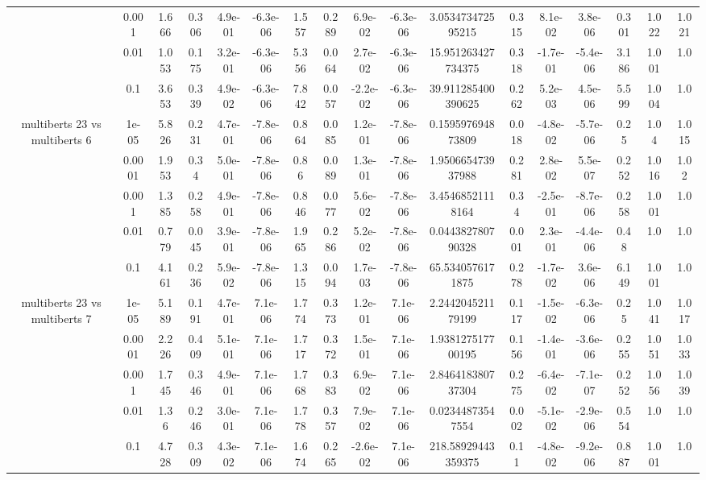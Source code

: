 \begin{tabular}{|c|c|c|c|c|c|c|c|c|c|c|c|c|c|c|c|c|}
 & 0.001 & 1.666 & 0.306 & 4.9e-01 & -6.3e-06 & 1.557 & 0.289 & 6.9e-02 & -6.3e-06 & 3.053473472595215 & 0.315 & 8.1e-02 & 3.8e-06 & 0.301 & 1.022 & 1.021 \\
 & 0.01 & 1.053 & 0.175 & 3.2e-01 & -6.3e-06 & 5.356 & 0.064 & 2.7e-02 & -6.3e-06 & 15.951263427734375 & 0.318 & -1.7e-01 & -5.4e-06 & 3.186 & 1.001 & 1.0 \\
 & 0.1 & 3.653 & 0.339 & 4.9e-02 & -6.3e-06 & 7.842 & 0.057 & -2.2e-02 & -6.3e-06 & 39.911285400390625 & 0.262 & 5.2e-03 & 4.5e-06 & 5.599 & 1.004 & 1.0 \\
\hline
\multirow{5}{*}{multiberts 23 vs multiberts 6} & 1e-05 & 5.826 & 0.231 & 4.7e-01 & -7.8e-06 & 0.864 & 0.085 & 1.2e-01 & -7.8e-06 & 0.159597694873809 & 0.018 & -4.8e-02 & -5.7e-06 & 0.25 & 1.04 & 1.015 \\
 & 0.0001 & 1.953 & 0.34 & 5.0e-01 & -7.8e-06 & 0.86 & 0.089 & 1.3e-01 & -7.8e-06 & 1.950665473937988 & 0.281 & 2.8e-02 & 5.5e-07 & 0.252 & 1.016 & 1.02 \\
 & 0.001 & 1.385 & 0.258 & 4.9e-01 & -7.8e-06 & 0.846 & 0.077 & 5.6e-02 & -7.8e-06 & 3.45468521118164 & 0.34 & -2.5e-01 & -8.7e-06 & 0.258 & 1.001 & 1.0 \\
 & 0.01 & 0.779 & 0.045 & 3.9e-01 & -7.8e-06 & 1.965 & 0.286 & 5.2e-02 & -7.8e-06 & 0.044382780790328 & 0.001 & 2.3e-01 & -4.4e-06 & 0.48 & 1.0 & 1.0 \\
 & 0.1 & 4.161 & 0.236 & 5.9e-02 & -7.8e-06 & 1.315 & 0.094 & 1.7e-03 & -7.8e-06 & 65.5340576171875 & 0.278 & -1.7e-02 & 3.6e-06 & 6.149 & 1.001 & 1.0 \\
\hline
\multirow{5}{*}{multiberts 23 vs multiberts 7} & 1e-05 & 5.189 & 0.191 & 4.7e-01 & 7.1e-06 & 1.774 & 0.373 & 1.2e-01 & 7.1e-06 & 2.244204521179199 & 0.117 & -1.5e-02 & -6.3e-06 & 0.25 & 1.041 & 1.017 \\
 & 0.0001 & 2.226 & 0.409 & 5.1e-01 & 7.1e-06 & 1.717 & 0.372 & 1.5e-01 & 7.1e-06 & 1.938127517700195 & 0.156 & -1.4e-01 & -3.6e-06 & 0.255 & 1.051 & 1.033 \\
 & 0.001 & 1.745 & 0.346 & 4.9e-01 & 7.1e-06 & 1.768 & 0.383 & 6.9e-02 & 7.1e-06 & 2.846418380737304 & 0.275 & -6.4e-02 & -7.1e-07 & 0.252 & 1.056 & 1.039 \\
 & 0.01 & 1.36 & 0.246 & 3.0e-01 & 7.1e-06 & 1.778 & 0.357 & 7.9e-02 & 7.1e-06 & 0.02344873547554 & 0.002 & -5.1e-02 & -2.9e-06 & 0.554 & 1.0 & 1.0 \\
 & 0.1 & 4.728 & 0.309 & 4.3e-02 & 7.1e-06 & 1.674 & 0.265 & -2.6e-02 & 7.1e-06 & 218.58929443359375 & 0.11 & -4.8e-02 & -9.2e-06 & 0.887 & 1.001 & 1.0 \\

\end{tabular}

